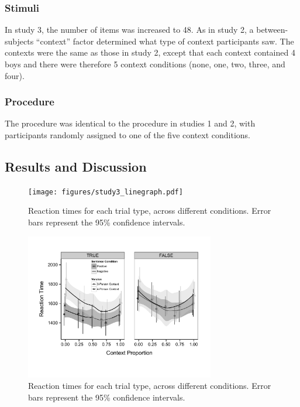 \documentclass[10pt,letterpaper]{article}
\begin{document}
\subsubsection{Stimuli}
In study 3, the number of items was increased to 48.  As in study 2, a between-subjects ``context'' factor determined what type of context participants saw.  The contexts were the same as those in study 2, except that each context contained 4 boys and there were therefore 5 context conditions (none, one, two, three, and four).  

\subsubsection{Procedure}
 The procedure was identical to the procedure in studies 1 and 2, with participants randomly assigned to one of the five context conditions.

\subsection{Results and Discussion}


\begin{figure}
\begin{center} 
\texttt{[image: figures/study3\_linegraph.pdf]}
\caption{\label{fig:addition_subs} Reaction times for each trial type, across different conditions.  Error bars represent the 95\% confidence intervals.}
\end{center} 
\end{figure}

\begin{figure}
\begin{center} 
\includegraphics[width=3.25in]{figures/combined_plot.pdf}
\caption{\label{fig:addition_subs} Reaction times for each trial type, across different conditions.  Error bars represent the 95\% confidence intervals.}
\end{center} 
\end{figure}
\end{document}
